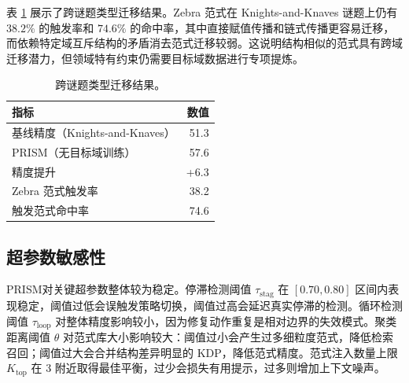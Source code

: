 \documentclass[UTF8,a4paper,12pt]{ctexart}
\newcommand{\PRISM}{PRISM}
\begin{document}
\begin{table}[t]
  \centering
  \caption{跨规模迁移结果。}
  \label{tab:transfer-scale}
\end{table}

表 \ref{tab:transfer-domain} 展示了跨谜题类型迁移结果。Zebra 范式在 Knights-and-Knaves 谜题上仍有 \(38.2\%\) 的触发率和 \(74.6\%\) 的命中率，其中直接赋值传播和链式传播更容易迁移，而依赖特定域互斥结构的矛盾消去范式迁移较弱。这说明结构相似的范式具有跨域迁移潜力，但领域特有约束仍需要目标域数据进行专项提炼。

\begin{table}[t]
  \centering
  \caption{跨谜题类型迁移结果。}
  \label{tab:transfer-domain}
  \begin{tabular}{lr}
    \toprule
    指标 & 数值 \\
    \midrule
    基线精度（Knights-and-Knaves） & 51.3 \\
    \PRISM（无目标域训练） & 57.6 \\
    精度提升 & +6.3 \\
    Zebra 范式触发率 & 38.2 \\
    触发范式命中率 & 74.6 \\
    \bottomrule
  \end{tabular}
\end{table}

\subsection{超参数敏感性}

\PRISM 对关键超参数整体较为稳定。停滞检测阈值 \(\tau_{\text{stag}}\) 在 \([0.70,0.80]\) 区间内表现稳定，阈值过低会误触发策略切换，阈值过高会延迟真实停滞的检测。循环检测阈值 \(\tau_{\text{loop}}\) 对整体精度影响较小，因为修复动作重复是相对边界的失效模式。聚类距离阈值 \(\theta\) 对范式库大小影响较大：阈值过小会产生过多细粒度范式，降低检索召回；阈值过大会合并结构差异明显的 KDP，降低范式精度。范式注入数量上限 \(K_{\text{top}}\) 在 3 附近取得最佳平衡，过少会损失有用提示，过多则增加上下文噪声。
\end{document}
